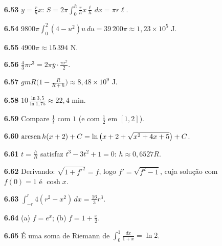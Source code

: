 {\begin{multicols}{2}
\begin{itemize}[leftmargin=2.7em,labelsep=0.5em,itemsep=1pt]
\item[\textbf{6.53}] $y=\tfrac rhx$: $S=2\pi\int_0^h\tfrac rhx\tfrac{\ell}{h}\,dx=\pi r\ell$.
\item[\textbf{6.54}] $9800\pi\int_0^2(4-u^2)u\,du=39\,200\pi\approx1{,}23\times10^5$ J.
\item[\textbf{6.55}] $4900\pi\approx15\,394$ N.
\item[\textbf{6.56}] $\tfrac43\pi r^3=2\pi\bar y\cdot\tfrac{\pi r^2}2$.
\item[\textbf{6.57}] $gmR\big(1-\tfrac R{R+h}\big)\approx8{,}48\times10^9$ J.
\item[\textbf{6.58}] $10\tfrac{\ln3{,}5}{\ln1{,}75}\approx22{,}4$ min.
\item[\textbf{6.59}] Compare $\tfrac1t$ com $1$ (e com $\tfrac12$ em $[1,2]$).
\item[\textbf{6.60}] $\operatorname{arcsen} h(x+2)+C=\ln\big(x+2+\sqrt{x^2+4x+5}\big)+C$.
\item[\textbf{6.61}] $t=\tfrac hR$ satisfaz $t^3-3t^2+1=0$: $h\approx0{,}6527R$.
\item[\textbf{6.62}] Derivando: $\sqrt{1+f'^2}=f$, logo $f'=\sqrt{f^2-1}$, cuja solução com $f(0)=1$ é $\cosh x$.
\item[\textbf{6.63}] $\int_{-r}^r4(r^2-x^2)\,dx=\tfrac{16}3r^3$.
\item[\textbf{6.64}] (a) $f=e^x$; (b) $f=1+\tfrac x2$.
\item[\textbf{6.65}] É uma soma de Riemann de $\int_0^1\tfrac{dx}{1+x}=\ln2$.
\end{itemize}\end{multicols}}
